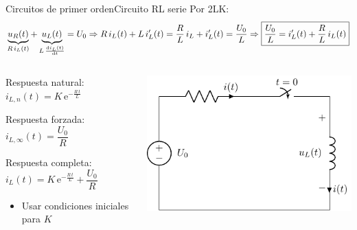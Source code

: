 \documentclass[aspectratio=169, xcolor={usenames,svgnames,dvipsnames}]{beamer}
\begin{document}
\begin{frame}{Circuitos de primer orden}{Circuito RL serie}
Por 2LK:
\begin{align*}
  \underbrace{u_R(t)}_{R\,i_L(t)} + \underbrace{u_L(t)}_{L\,\diff{i_L(t)}{t}} = U_0 \Rightarrow R\,i_L(t)+L\, i_L'(t)=\dfrac{R}{L}\,i_L+i_L'(t)=\dfrac{U_0}{L}\Rightarrow \boxed{\dfrac{U_0}{L}=i_L'(t)+\dfrac{R}{L}\,i_L(t)}
\end{align*}
\begin{columns}
\begin{column}{0.6\linewidth}
Respuesta natural: $i_{L,n}(t) = K\,\mathrm{e}^{-\frac{R\,t}{L}} $

Respuesta forzada: $  i_{L,\infty}(t) = \dfrac{U_0}{R}$ 

Respuesta completa: $i_L(t)=K\,\mathrm{e}^{-\frac{R\,t}{L}}+\dfrac{U_0}{R}$
\begin{itemize}
    \item Usar condiciones iniciales para $K$
\end{itemize}
\end{column}
\begin{column}{0.4\linewidth}
\begin{center}
\includegraphics[width=\linewidth]{../figs/transitorio_circuitoRL.pdf}
\end{center}
\end{column}
\end{columns}
\end{frame}
\end{document}
